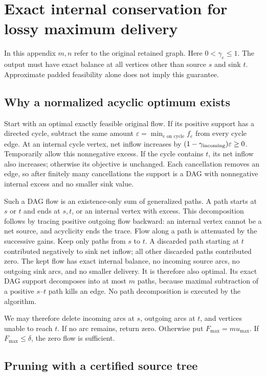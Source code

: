 \documentclass[11pt]{article}
\theoremstyle{definition}\newtheorem{definition}[theorem]{Definition}
\theoremstyle{remark}\newtheorem{remark}[theorem]{Remark}
\begin{document}
\section{Exact internal conservation for lossy maximum delivery}
\label{app:lossy-repair}

In this appendix $m,n$ refer to the original retained graph. Here $0<\gamma_e\le1$. The output must have exact balance at all
vertices other than source $s$ and sink $t$. Approximate padded
feasibility alone does not imply this guarantee.

\subsection{Why a normalized acyclic optimum exists}

Start with an optimal exactly feasible original flow. If its positive
support has a directed cycle, subtract the same amount
$\varepsilon=\min_{e\text{ on cycle}}f_e$ from every cycle edge.
At an internal cycle vertex, net inflow increases by
$(1-\gamma_{\rm incoming})\varepsilon\ge0$.
Temporarily allow this nonnegative excess. If the cycle contains $t$,
its net inflow also increases; otherwise its objective is unchanged.
Each cancellation removes an edge, so after finitely many cancellations
the support is a DAG with nonnegative internal excess and no smaller
sink value.

Such a DAG flow is an existence-only sum of generalized paths. A path
starts at $s$ or $t$ and ends at $s,t$, or an internal vertex with excess.
This decomposition follows by tracing positive outgoing flow backward:
an internal vertex cannot be a net source, and acyclicity ends the trace.
Flow along a path is attenuated by the successive gains. Keep only
paths from $s$ to $t$. A discarded path starting at $t$ contributed
negatively to sink net inflow; all other discarded paths contributed
zero. The kept flow has exact internal balance, no incoming source
arcs, no outgoing sink arcs, and no smaller delivery. It is therefore
also optimal. Its exact DAG support decomposes into at most $m$ paths,
because maximal subtraction of a positive $s$--$t$ path kills an edge.
No path decomposition is executed by the algorithm.

We may therefore delete incoming arcs at $s$, outgoing arcs at $t$,
and vertices unable to reach $t$. If no arc remains, return zero. Otherwise put $F_{\max}=m u_{\max}$.
If $F_{\max}\le\delta$, the zero flow is sufficient.

\subsection{Pruning with a certified source tree}
\end{document}

